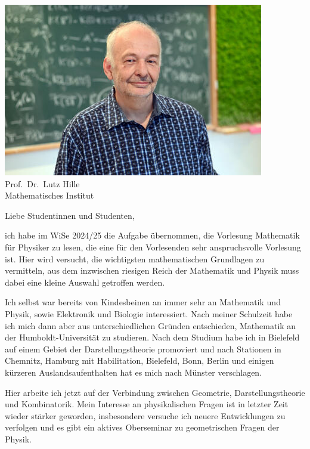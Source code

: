 \begin{multicols}{2}
\begin{center}
	\includegraphics[width=\columnwidth, height=0.35\textheight]{res/vorstellungsfotos/Hille.jpg}\\
	\smallskip
 	Prof.\ Dr.\ Lutz Hille\\
	Mathematisches Institut
\end{center}
Liebe Studentinnen und Studenten,

ich habe im WiSe 2024/25 die Aufgabe übernommen, die Vorlesung Mathematik für Physiker zu lesen, die eine für den Vorlesenden sehr anspruchsvolle Vorlesung ist. Hier wird versucht, die wichtigsten mathematischen Grundlagen zu vermitteln, aus dem inzwischen riesigen Reich der Mathematik und Physik muss dabei eine kleine Auswahl getroffen werden.

Ich selbst war bereits von Kindesbeinen an immer sehr an Mathematik und Physik, sowie Elektronik und Biologie interessiert. Nach meiner Schulzeit habe ich mich dann aber aus unterschiedlichen Gründen entschieden, Mathematik an der Humboldt-Universität zu studieren. Nach dem Studium habe ich in Bielefeld auf einem Gebiet der Darstellungstheorie promoviert und nach Stationen in Chemnitz, Hamburg mit Habilitation, Bielefeld, Bonn, Berlin und einigen kürzeren Auslandsaufenthalten hat es mich nach Münster verschlagen.

Hier arbeite ich jetzt auf der Verbindung zwischen Geometrie, Darstellungstheorie und Kombinatorik. Mein Interesse an physikalischen Fragen ist in letzter Zeit wieder stärker geworden, insbesondere versuche ich neuere Entwicklungen zu verfolgen und es gibt ein aktives Oberseminar zu geometrischen Fragen der Physik.


\end{multicols}
